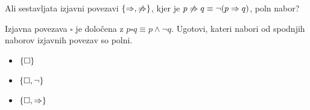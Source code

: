 \begin{vaja}
Ali sestavljata izjavni povezavi $\set{ \impl, \not\impl }$, kjer je $p \not\Rightarrow q \equiv \lnot (p \Rightarrow q)$, poln nabor?
\end{vaja}

\begin{vaja}
Izjavna povezava $\square$ je določena z $p \square q \equiv p \land \lnot q$. Ugotovi, kateri nabori od spodnjih naborov izjavnih povezav so polni.
\begin{itemize}
 \item $\set{ \square }$
 \item $\set{ \square, \lnot }$
 \item $\set{ \square, \impl }$
\end{itemize}
\end{vaja}

